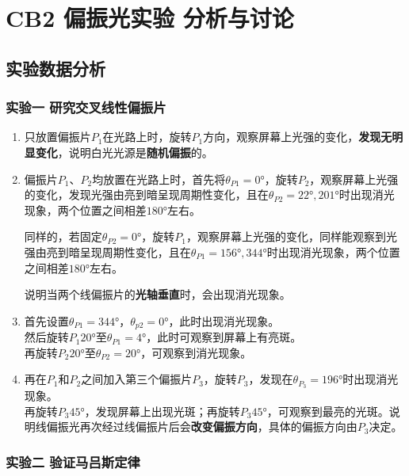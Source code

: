 \documentclass[dvipsnames, svgnames,a4paper,11pt]{article}
\begin{document}
\section{CB2 \quad 偏振光实验 \quad\heiti 分析与讨论}

\subsection{实验数据分析}

	\subsubsection{实验一 \quad 研究交叉线性偏振片}

	\begin{enumerate}
		\item 只放置偏振片$P_1$在光路上时，旋转$P_1$方向，观察屏幕上光强的变化，\textbf{发现无明显变化}，说明白光光源是\textbf{随机偏振}的。
		\item 偏振片$P_1$、$P_2$均放置在光路上时，首先将$\theta_{P1}=\ang{0}$，旋转$P_2$，观察屏幕上光强的变化，发现光强由亮到暗呈现周期性变化，且在$\theta_{P2}=\ang{22},\ang{201}$时出现消光现象，两个位置之间相差$\ang{180}$左右。
		
		同样的，若固定$\theta_{P2}=\ang{0}$，旋转$P_1$，观察屏幕上光强的变化，同样能观察到光强由亮到暗呈现周期性变化，且在$\theta_{P1}=\ang{156},\ang{344}$时出现消光现象，两个位置之间相差$\ang{180}$左右。

		说明当两个线偏振片的\textbf{光轴垂直}时，会出现消光现象。

		\item 首先设置$\theta_{P1}=\ang{344}$，$\theta_{p2}=\ang{0}$，此时出现消光现象。\\
			  然后旋转$P_1$$\ang{20}$至$\theta_{P1}=\ang{4}$，此时可观察到屏幕上有亮斑。\\
			  再旋转$P_2$$\ang{20}$至$\theta_{P2}=\ang{20}$，可观察到消光现象。

		\item 再在$P_1$和$P_2$之间加入第三个偏振片$P_3$，旋转$P_3$，发现在$\theta_{P_3}=\ang{196}$时出现消光现象。\\
			再旋转$P_3\ang{45}$，发现屏幕上出现光斑；再旋转$P_3\ang{45}$，可观察到最亮的光斑。说明线偏振光再次经过线偏振片后会\textbf{改变偏振方向}，具体的偏振方向由$P_3$决定。
	\end{enumerate}




	\subsubsection{实验二 \quad 验证马吕斯定律}
\end{document}
